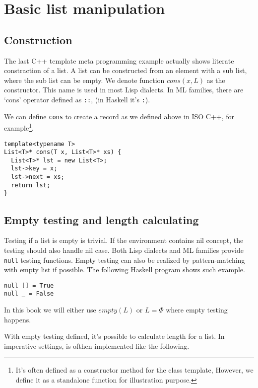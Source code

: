 \documentclass{article}
\begin{document}
\section{Basic list manipulation}

\subsection{Construction}

The last C++ template meta programming example actually shows literate constraction of a list.
A list can be constructed from an element with a sub list, where the sub list can be empty.
We denote function $cons(x, L)$ as the constructor. This name is used in most Lisp dialects.
In ML families, there are `cons' operator defined as \verb|::|, (in Haskell it's \verb|:|).

We can define \verb|cons| to create a record as we defined above in ISO C++, for example\footnote{
It's often defined as a constructor method for the class template, However, we define it as a standalone
function for illustration purpose.}.

\lstset{language=C++}
\begin{lstlisting}
template<typename T>
List<T>* cons(T x, List<T>* xs) {
  List<T>* lst = new List<T>;
  lst->key = x;
  lst->next = xs;
  return lst;
}
\end{lstlisting}

\subsection{Empty testing and length calculating}

Testing if a list is empty is trivial. If the environment contains nil concept, the testing should
also handle nil case. Both Lisp dialects and ML families provide \verb|null| testing functions.
Empty testing can also be realized by pattern-matching with empty list if possible. The following
Haskell program shows such example.

\lstset{language=Haskell}
\begin{lstlisting}
null [] = True
null _ = False
\end{lstlisting}

In this book we will either use $empty(L)$ or $L = \Phi$ where empty testing happens.

With empty testing defined, it's possible to calculate length for a list. 
In imperative settings,  is ofthen implemented like the following.
\end{document}
